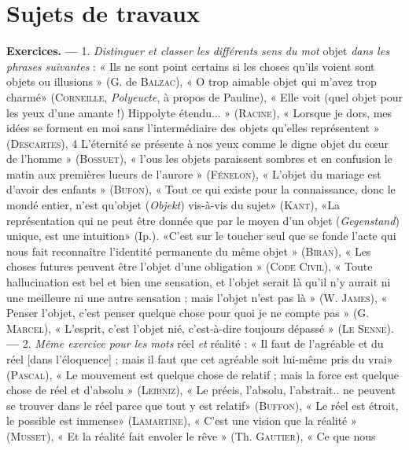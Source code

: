 \vspace{0.24cm}
{\footnotesize 
\section{Sujets de travaux}

{\bf Exercices.} {\bf —} 1. {\it Distinguer et classer les différents sens du mot} objet {\it dans
les phrases suivantes} : « Ils ne sont point certains si les choses qu'ils voient
sont objets ou illusions » (G. de \textsc{Balzac}), « O trop aimable objet qui m'avez
trop charmé» (\textsc{Corneille}, {\it Polyeucte}, à propos de Pauline), « Elle voit
(quel objet pour les yeux d’une amante !) Hippolyte étendu... » (\textsc{Racine}),
« Lorsque je dors, mes idées se forment en moi sans l'intermédiaire des
objets qu’elles représentent » (\textsc{Descartes}), 4 L'éternité se présente à nos
yeux comme le digne objet du cœur de l’homme » (\textsc{Bossuet}), « l'ous les
objets paraissent sombres et en confusion le matin aux premières lueurs de
l’aurore » (\textsc{Fénelon}), « L'objet du mariage est d’avoir des enfants » (\textsc{Bufon}),
« Tout ce qui existe pour la connaissance, donc le mondé entier, n’est
qu’objet ({\it Objekt}) vis-à-vis du sujet» (\textsc{Kant}), «La représentation qui ne
peut être donnée que par le moyen d’un objet ({\it Gegenstand}) unique, est
une intuition» (Ip.). «C'est sur le toucher seul que se fonde l'acte qui
nous fait reconnaître l'identité permanente du même objet » (\textsc{Biran}), « Les
choses futures peuvent être l’objet d’une obligation » (\textsc{Code Civil}), « Toute
hallucination est bel et bien une sensation, et l’objet serait là qu'il n'y
aurait ni une meilleure ni une autre sensation ; mais l’objet n’est pas là »
(W. \textsc{James}), « Penser l’objet, c’est penser quelque chose pour quoi je ne
compte pas » (G. \textsc{Marcel}), « L'esprit, c’est l’objet nié, c’est-à-dire toujours
dépassé » (\textsc{Le Senne}). {\bf —} 2. {\it Même exercice pour les mots} réel {\it et} réalité :
« Il faut de l’agréable et du réel [dans l’éloquence] ; mais il faut que cet
agréable soit lui-même pris du vrai» (\textsc{Pascal}), « Le mouvement est quelque
chose de relatif ; mais la force est quelque chose de réel et d’absolu »
(\textsc{Leibniz}), « Le précis, l'absolu, l’abstrait.. ne peuvent se trouver dans
le réel parce que tout y est relatif» (\textsc{Buffon}), « Le réel est étroit, le
possible est immense» (\textsc{Lamartine}), « C’est une vision que la réalité »
(\textsc{Musset}), « Et la réalité fait envoler le rêve » (Th. \textsc{Gautier}), « Ce que nous
}
